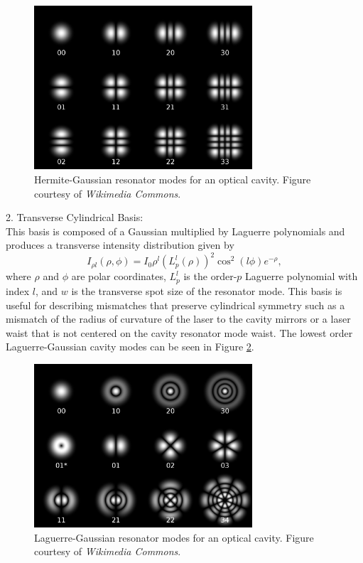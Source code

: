 \begin{figure}
\begin{center}
\includegraphics[width=3.2in]{./Pictures/Hermite-gaussian.png}
\caption{\label{fig:hermite_modes}Hermite-Gaussian resonator modes for an optical cavity. Figure courtesy of {\it Wikimedia Commons}.}
\end{center}
\end{figure}

2. Transverse Cylindrical Basis:\\
This basis is composed of a Gaussian multiplied by Laguerre polynomials and produces a transverse intensity distribution given by
\[
I_{\rho l}(\rho ,\phi )=I_0\rho^l\left(L_p^l(\rho)\right)^2\cos^2(l\phi)e^{-\rho},
\]
where $\rho$ and $\phi$ are polar coordinates, $L_p^l$ is the order-$p$ Laguerre polynomial with index $l$, and $w$ is the transverse spot size of the resonator mode. This basis is useful for describing mismatches that preserve cylindrical symmetry such as a mismatch of the radius of curvature of the laser to the cavity mirrors or a laser waist that is not centered on the cavity resonator mode waist. The lowest order Laguerre-Gaussian cavity modes can be seen in Figure \ref{fig:laguerre_modes}.

\begin{figure}
\begin{center}
\includegraphics[width=3.2in]{./Pictures/Laguerre-gaussian.png}
\caption{\label{fig:laguerre_modes}Laguerre-Gaussian resonator modes for an optical cavity. Figure courtesy of {\it Wikimedia Commons}.}
\end{center}
\end{figure}

